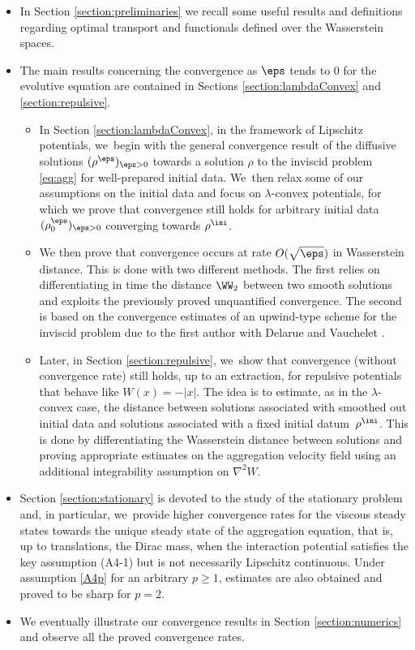 \begin{itemize}
\item
In Section \ref{section:preliminaries} we recall some useful results and definitions regarding optimal transport and functionals defined over the Wasserstein spaces.

\item
The main results concerning the convergence as $\eps$ tends to 0 for the evolutive equation are contained in Sections \ref{section:lambdaConvex} and \ref{section:repulsive}.

\begin{itemize}
\item In Section \ref{section:lambdaConvex}, in the framework of Lipschitz potentials, we~begin with the general convergence result of the diffusive solutions $(\rho^\eps)_{\eps>0}$ towards a solution $\rho$ to the inviscid problem \eqref{eq:agg} for well-prepared initial data. We~then relax some of our assumptions on the initial data and focus on $\lambda$-convex potentials, for which we prove that convergence still holds for arbitrary initial data $(\rho_0^\eps)_{\eps >0}$ converging towards $\rho^{\ini}$. \item We then prove that convergence occurs at rate $O(\sqrt{\eps})$ in Wasserstein distance. This is done with two different methods. The first relies on differentiating in time the distance $\WW_2$ between two smooth solutions and exploits the previously proved unquantified convergence. The second is based on the convergence estimates of an upwind-type scheme for the inviscid problem due to the first author with Delarue and Vauchelet \cite{dlv17, dlv20}.

\item Later, in Section \ref{section:repulsive}, we~show that convergence (without convergence rate) still holds, up to an extraction, for repulsive potentials that behave like $W(x) = -|x|$. The idea is to estimate, as in the $\lambda$-convex case, the distance between solutions associated with smoothed out initial data and solutions associated with a fixed initial datum~$\rho^{\ini}$. This is done by differentiating the Wasserstein distance between solutions and proving appropriate estimates on the aggregation velocity field using an additional integrability assumption on $\nabla^2 W$.
\end{itemize}
\item
Section \ref{section:stationary} is devoted to the study of the stationary problem and, in particular, we~provide higher convergence rates for the viscous steady states towards the unique steady state of the aggregation equation, that is, up to translations, the Dirac mass, when the interaction potential satisfies the key assumption (A4-1) but is not necessarily Lipschitz continuous. Under assumption \eqref{A4p} for an arbitrary $p\geq 1$, estimates are also obtained and proved to be sharp for $p=2$.

\item
We eventually illustrate our convergence results in Section \ref{section:numerics} and observe all the proved convergence rates.
\end{itemize}

